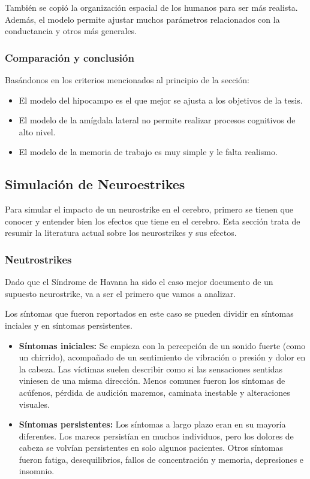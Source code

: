 \documentclass[12pt, letterpaper]{article}
\begin{document}
También se copió la organización espacial de los humanos para ser más realista. Además, el modelo permite ajustar muchos parámetros relacionados con la conductancia y otros más generales.

\subsubsection{Comparación y conclusión}
Basándonos en los criterios mencionados al principio de la sección:
\begin{itemize}
    \item El modelo del hipocampo es el que mejor se ajusta a los objetivos de la tesis.
    \item El modelo de la amígdala lateral no permite realizar procesos cognitivos de alto nivel.
    \item El modelo de la memoria de trabajo es muy simple y le falta realismo.
\end{itemize}

\subsection{Simulación de Neuroestrikes}
Para simular el impacto de un neurostrike en el cerebro, primero se tienen que conocer y entender bien los efectos que tiene en el cerebro. Esta sección trata de resumir la literatura actual sobre los neurostrikes y sus efectos.

\subsubsection{Neutrostrikes}
Dado que el Síndrome de Havana ha sido el caso mejor documento de un supuesto neurostrike, va a ser el primero que vamos a analizar. 

Los síntomas que fueron reportados en este caso se pueden dividir en síntomas inciales y en síntomas persistentes.
\begin{itemize}
    \item \textbf{Síntomas iniciales:} Se empieza con la percepción de un sonido fuerte (como un chirrido), acompañado de un sentimiento de vibración o presión y dolor en la cabeza. Las víctimas suelen describir como si las sensaciones sentidas viniesen de una misma dirección. Menos comunes fueron los síntomas de acúfenos, pérdida de audición maremos, caminata inestable y alteraciones visuales.
    \item \textbf{Síntomas persistentes:} Los síntomas a largo plazo eran en su mayoría diferentes. Los mareos persistían en muchos individuos, pero los dolores de cabeza se volvían persistentes en solo algunos pacientes. Otros síntomas fueron fatiga, desequilibrios, fallos de concentración y memoria, depresiones e insomnio.
\end{itemize}
\end{document}
